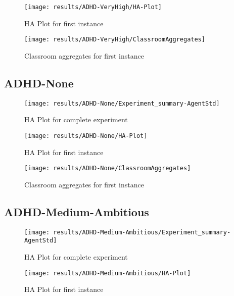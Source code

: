 \begin{figure}[H]
    \centering
    \texttt{[image: results/ADHD-VeryHigh/HA-Plot]}
    \caption{HA Plot for first instance}
\end{figure}

\begin{figure}[H]
    \centering
    \texttt{[image: results/ADHD-VeryHigh/ClassroomAggregates]}
    \caption{Classroom aggregates for first instance}
\end{figure}


\subsection{ADHD-None}

\begin{figure}[H]
    \centering
    \texttt{[image: results/ADHD-None/Experiment\_summary-AgentStd]}
    \caption{HA Plot for complete experiment}
\end{figure}

\begin{figure}[H]
    \centering
    \texttt{[image: results/ADHD-None/HA-Plot]}
    \caption{HA Plot for first instance}
\end{figure}

\begin{figure}[H]
    \centering
    \texttt{[image: results/ADHD-None/ClassroomAggregates]}
    \caption{Classroom aggregates for first instance}
\end{figure}


\subsection{ADHD-Medium-Ambitious}

\begin{figure}[H]
    \centering
    \texttt{[image: results/ADHD-Medium-Ambitious/Experiment\_summary-AgentStd]}
    \caption{HA Plot for complete experiment}
\end{figure}

\begin{figure}[H]
    \centering
    \texttt{[image: results/ADHD-Medium-Ambitious/HA-Plot]}
    \caption{HA Plot for first instance}
\end{figure}

